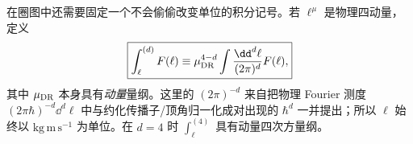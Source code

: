在圈图中还需要固定一个不会偷偷改变单位的积分记号。若 $\ell^\mu$ 是物理四动量，定义
\begin{equation}
 \boxed{
 \int_{\ell}^{(d)}F(\ell)
 \equiv
 \mu_{\rm DR}^{4-d}
 \int\frac{\dd^d \ell}{(2\pi)^d}F(\ell),}
 \label{eq:reduced-loop-measure-si-r10}
\end{equation}
其中 $\mu_{\rm DR}$ 本身具有\emph{动量}量纲。这里的 $(2\pi)^{-d}$ 来自把物理 Fourier 测度 $(2\pi\hbar)^{-d}\dd^d \ell$ 中与约化传播子/顶角归一化成对出现的 $\hbar^d$ 一并提出；所以 $\ell$ 始终以 $\mathrm{kg\,m\,s^{-1}}$ 为单位。在 $d=4$ 时 $\int_\ell^{(4)}$ 具有动量四次方量纲。

